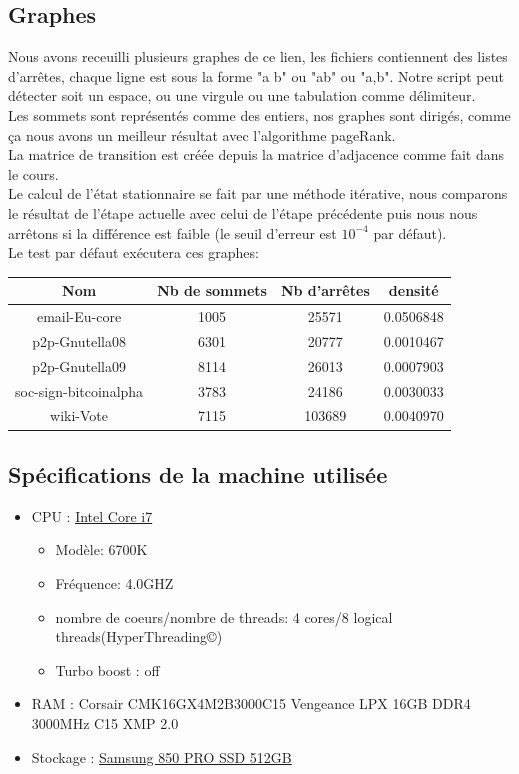 \documentclass{report}
\begin{document}
\subsection{Graphes}
Nous avons receuilli plusieurs graphes de ce \label{site}{lien}, les fichiers contiennent des listes
d'arrêtes, chaque ligne est sous la forme "a b" ou "a\hspace{1em}b" ou "a,b". Notre script peut
détecter soit un espace, ou une virgule ou une tabulation comme délimiteur.\\
Les sommets sont représentés comme des entiers, nos graphes sont dirigés, comme ça nous avons un
meilleur résultat avec l'algorithme pageRank.\\
La matrice de transition est créée depuis la matrice d'adjacence comme fait dans le cours.\\
Le calcul de l'état stationnaire se fait par une méthode itérative, nous comparons le résultat
de l'étape actuelle avec celui de l'étape précédente puis nous nous arrêtons si la différence est
faible (le seuil d'erreur est $10^{-4}$ par défaut).\\
Le test par défaut exécutera ces graphes:
\begin{table}[ht!]
\begin{tabular}{|c|c|c|c|}
  \hline
  Nom & Nb de sommets & Nb d'arrêtes & densité \\
  \hline
  email-Eu-core & 1005 & 25571 & 0.0506848\\
  \hline
  p2p-Gnutella08 & 6301 & 20777 & 0.0010467 \\
  \hline
  p2p-Gnutella09 & 8114 & 26013 & 0.0007903 \\
  \hline
  soc-sign-bitcoinalpha & 3783 & 24186 & 0.0030033 \\
  \hline
  wiki-Vote & 7115 & 103689 & 0.0040970 \\
  \hline
\end{tabular}
\end{table}
\newpage
\subsection{Spécifications de la machine utilisée}
    \begin{itemize}[label=$\bullet$]
      \item CPU :
      \href{https://ark.intel.com/products/88195/Intel-Core-i7-6700K-Processor-8M-Cache-up-to-4_20-GHz}
        {Intel Core i7}
        \begin{itemize}[label=$\ast$]
          \item Modèle: 6700K
          \item Fréquence: 4.0GHZ
          \item nombre de coeurs/nombre de threads: 4 cores/8 logical threads(HyperThreading©)
          \item Turbo boost : off
        \end{itemize}
      \item RAM : Corsair CMK16GX4M2B3000C15 Vengeance LPX 16GB DDR4 3000MHz C15 XMP 2.0
      \item Stockage : \href{http://downloadcenter.samsung.com/content/UM/201711/20171115103115156/Samsung_SSD_850_PRO_Data_Sheet_Rev_3.pdf}
          {Samsung 850 PRO SSD 512GB}
    \end{itemize}
\end{document}
